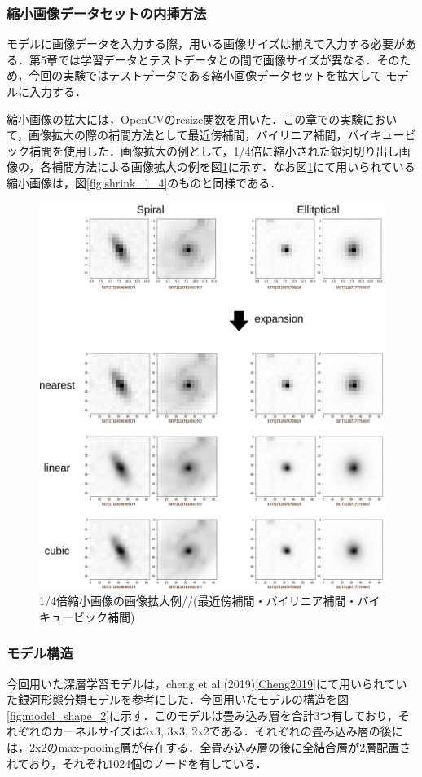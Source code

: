 \documentclass[a4j, 11pt]{jreport}
\begin{document}
\subsubsection{縮小画像データセットの内挿方法}
モデルに画像データを入力する際，用いる画像サイズは揃えて入力する必要がある．第5章では学習データとテストデータとの間で画像サイズが異なる．そのため，今回の実験ではテストデータである縮小画像データセットを拡大して
モデルに入力する．

縮小画像の拡大には，OpenCVのresize関数を用いた．この章での実験において，画像拡大の際の補間方法として最近傍補間，バイリニア補間，バイキュービック補間を使用した．画像拡大の例として，1/4倍に縮小された銀河切り出し画像の，各補間方法による画像拡大の例を図\ref{fig:kakudai_1_4}に示す．なお図\ref{fig:kakudai_1_4}にて用いられている縮小画像は，図\ref{fig:shrink_1_4}のものと同様である．

\begin{figure}
 \centering
 \includegraphics[width=13cm]{images/5syou/syuron_5syou_kakudai/ver1/5syou_kakudai_ver1.png}
 \caption{1/4倍縮小画像の画像拡大例//(最近傍補間・バイリニア補間・バイキュービック補間)}
 \label{fig:kakudai_1_4}
\end{figure}

\subsubsection{モデル構造}
今回用いた深層学習モデルは，cheng et al.(2019)\ref{Cheng2019}にて用いられていた銀河形態分類モデルを参考にした．今回用いたモデルの構造を図\ref{fig:model_shape_2}に示す．このモデルは畳み込み層を合計3つ有しており，それぞれのカーネルサイズは3x3, 3x3, 2x2である．それぞれの畳み込み層の後には，2x2のmax-pooling層が存在する．全畳み込み層の後に全結合層が2層配置されており，それぞれ1024個のノードを有している．
\end{document}

